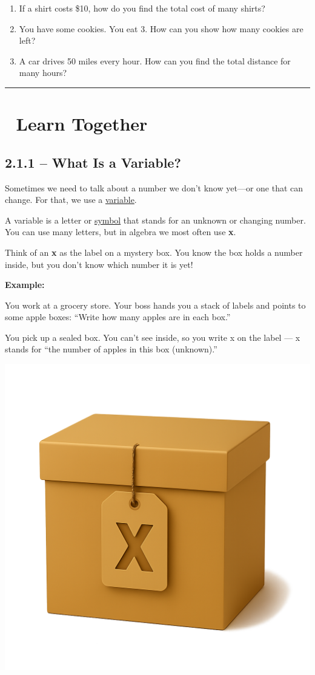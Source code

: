 \documentclass[
  letterpaper,
  DIV=11,
  numbers=noendperiod]{scrreprt}
\begin{document}

\begin{enumerate}
\def\labelenumi{\arabic{enumi}.}
\item
  If a shirt costs \$10, how do you find the total cost of many shirts?
\item
  You have some cookies. You eat 3. How can you show how many cookies
  are left?
\item
  A car drives 50 miles every hour. How can you find the total distance
  for many hours?
\end{enumerate}

\begin{center}\rule{0.5\linewidth}{0.5pt}\end{center}

\section*{👥 Learn Together}\label{learn-together-7}


\subsection*{2.1.1 -- What Is a Variable?}\label{what-is-a-variable}

Sometimes we need to talk about a number we don't know yet---or one that
can change. For that, we use a
\href{./glossary.html\#glossary-variable}{variable}.

A variable is a letter or
\href{./glossary.html\#glossary-symbol}{symbol} that stands for an
unknown or changing number. You can use many letters, but in algebra we
most often use \textbf{x}.

Think of an \textbf{x} as the label on a mystery box. You know the box
holds a number inside, but you don't know which number it is yet!

\textbf{Example:}

You work at a grocery store. Your boss hands you a stack of labels and
points to some apple boxes: ``Write how many apples are in each box.''

You pick up a sealed box. You can't see inside, so you write x on the
label --- x stands for ``the number of apples in this box (unknown).''

\begin{center}
\includegraphics[width=0.35\linewidth,height=\textheight,keepaspectratio]{images/Unit_2/Lesson_1/AppleBoxX.png}
\end{center}
\end{document}
